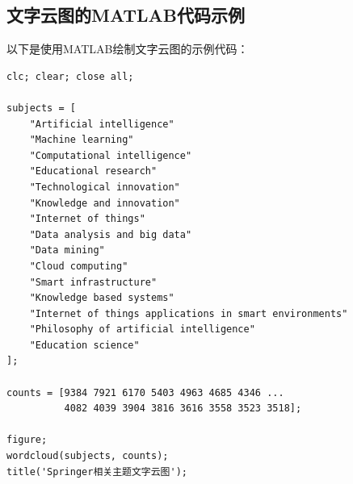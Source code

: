 \documentclass[UTF8,12pt]{ctexart}
\begin{document}
\subsection{文字云图的MATLAB代码示例}
以下是使用MATLAB绘制文字云图的示例代码：
\begin{lstlisting}
clc; clear; close all;

subjects = [
    "Artificial intelligence"
    "Machine learning"
    "Computational intelligence"
    "Educational research"
    "Technological innovation"
    "Knowledge and innovation"
    "Internet of things"
    "Data analysis and big data"
    "Data mining"
    "Cloud computing"
    "Smart infrastructure"
    "Knowledge based systems"
    "Internet of things applications in smart environments"
    "Philosophy of artificial intelligence"
    "Education science"
];

counts = [9384 7921 6170 5403 4963 4685 4346 ...
          4082 4039 3904 3816 3616 3558 3523 3518];

figure;
wordcloud(subjects, counts);
title('Springer相关主题文字云图');
\end{lstlisting}
\end{document}
